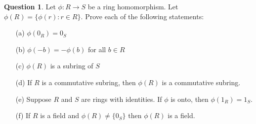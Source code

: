 \documentclass[11pt]{amsart}
\theoremstyle{definition}\newtheorem{question}{Question}
\theoremstyle{definition}\newtheorem{claim}{Claim}
\theoremstyle{remark}\newtheorem*{solution}{Solution}
\begin{document}
\begin{question}
    Let $\phi : R \to S$ be a ring homomorphism. Let $\phi(R) = \{\phi(r) : r \in R\}$. Prove each of the following statements:
    \begin{itemize}
        \item[(a)] $\phi(0_R) = 0_S$
        \item[(b)] $\phi(-b) = -\phi(b)$ for all $b \in R$
        \item[(c)] $\phi(R)$ is a subring of $S$
        \item[(d)] If $R$ is a commutative subring, then $\phi(R)$ is a commutative subring.
        \item[(e)] Suppose $R$ and $S$ are rings with identities. If $\phi$ is onto, then $\phi(1_R) = 1_S$.
        \item[(f)] If $R$ is a field and $\phi(R) \neq \{0_S\}$ then $\phi(R)$ is a field.
    \end{itemize}
\end{question}
\end{document}
